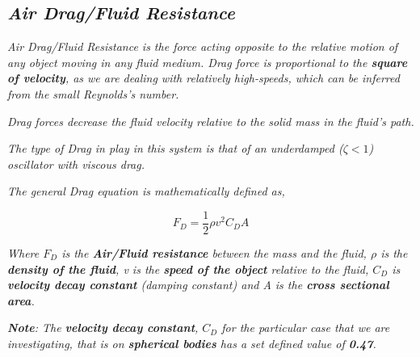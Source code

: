         
        
        
\subsection{\textit{Air Drag/Fluid Resistance}}
        
    \textit{Air Drag/Fluid Resistance is the force acting opposite to the relative motion of any object moving in any fluid medium. Drag force is proportional to the \textbf{square of velocity}, as we are dealing with relatively high-speeds, which can be inferred from the small Reynolds's number.}
            
    \textit{Drag forces decrease the fluid velocity relative to the solid mass in the fluid's path.}
            
    \textit{The type of Drag in play in this system is that of an underdamped ($\zeta < 1$) oscillator with viscous drag.}
            
    \textit{The general Drag equation is mathematically defined as,}
            
        $$F_D = \frac{1}{2}\rho v^2C_DA$$
           
    \textit{Where $F_D$ is the \textbf{Air/Fluid resistance} between the mass and the fluid, $\rho$ is the \textbf{density of the fluid}, v is the \textbf{speed of the object} relative to the fluid, $C_D$ is \textbf{velocity decay constant} (damping constant) and A is the \textbf{cross sectional area}.}
            
    \textit{\textbf{Note}: The\textbf{ velocity decay constant}, $C_D$ for the particular case that we are investigating, that is on \textbf{spherical bodies} has a set defined value of \textbf{0.47}.}
            
            

